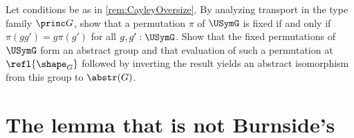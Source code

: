 \begin{xca}\label{xca:PP-fixed-permutations}
  Let conditions be as in \cref{rem:CayleyOversize}.  By analyzing transport in
  the type family $\princ G$, show that a permutation $\pi$ of $\USymG$
  is fixed if and only if $\pi(gg')=g\pi(g')$ for all $g,g':\USymG$.  Show that
  the fixed permutations of $\USymG$ form an abstract group and that evaluation
  of such a permutation at $\refl{\sh_G}$ followed by inverting the result
  yields an abstract isomorphism from this group to $\abstr(G)$.
\end{xca}



\section{The lemma that is not Burnside's}
\label{sec:burnsides-lemma}
\label{lem:burnsides-lemma}

